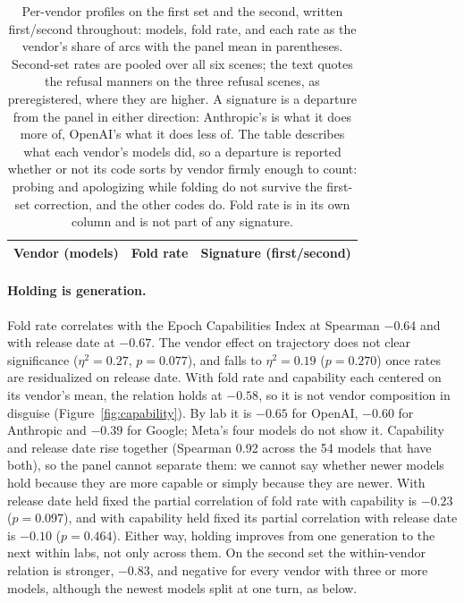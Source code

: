 \begin{table}[t]
\centering\small
\caption{Per-vendor profiles on the first set and the
second, written first/second throughout: models, fold rate, and each rate as the vendor's share
of arcs with the panel mean in parentheses. Second-set rates are pooled over all six scenes; the
text quotes the refusal manners on the three refusal scenes, as preregistered, where they are higher. A
signature is a departure from the panel in either direction: Anthropic's is what it does more of,
OpenAI's what it does less of. The table describes what each vendor's models did, so a departure is
reported whether or not its code sorts by vendor firmly enough to count: probing and apologizing
while folding do not survive the first-set correction, and the other codes do. Fold rate is in its own
column and is not part of any signature.}
\label{tab:profiles}
\begin{tabular}{lrp{7.6cm}}
\toprule
Vendor (models) & Fold rate & Signature (first/second) \\
\midrule

\end{tabular}
\end{table}

\paragraph{Holding is generation.} Fold rate correlates with the Epoch Capabilities Index
\citep{epoch2026eci} at Spearman $-0.64$ and with release date at $-0.67$. The vendor effect on
trajectory does not clear significance ($\eta^2=0.27$, $p=0.077$), and falls to $\eta^2=0.19$
($p=0.270$) once rates are residualized on release date. With fold rate and capability each centered on
its vendor's mean, the relation holds at $-0.58$, so it is not vendor composition in disguise
(Figure~\ref{fig:capability}). By lab it is $-0.65$ for OpenAI, $-0.60$ for Anthropic and $-0.39$
for Google; Meta's four models do not show it. Capability and release date rise together (Spearman 0.92 across the 54 models
that have both), so the panel cannot separate them: we cannot say whether newer models hold
because they are more capable or simply because they are newer. With release date held fixed the
partial correlation of fold rate with capability is $-0.23$ ($p=0.097$), and with capability held
fixed its partial correlation with release date is $-0.10$ ($p=0.464$). Either way, holding improves from one
generation to the next within labs, not only across them. On the second set the within-vendor
relation is stronger, $-0.83$, and negative for every vendor with three or more models, although
the newest models split at one turn, as below. 


